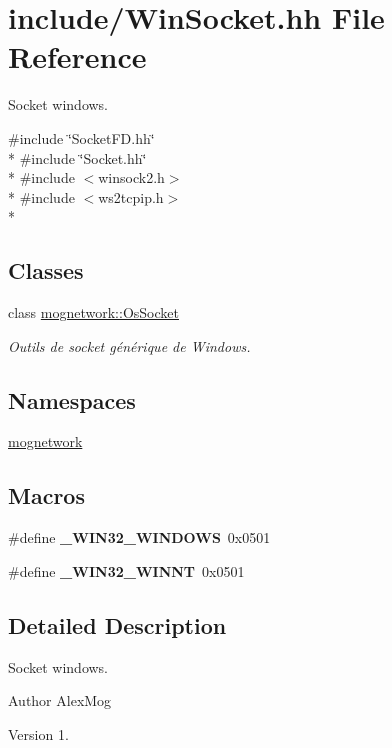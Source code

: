 \hypertarget{_win_socket_8hh}{\section{include/\-Win\-Socket.hh File Reference}
\label{_win_socket_8hh}
}


Socket windows.  


{\ttfamily \#include \char`\"{}Socket\-F\-D.\-hh\char`\"{}}\\*
{\ttfamily \#include \char`\"{}Socket.\-hh\char`\"{}}\\*
{\ttfamily \#include $<$winsock2.\-h$>$}\\*
{\ttfamily \#include $<$ws2tcpip.\-h$>$}\\*
\subsection*{Classes}
\begin{DoxyCompactItemize}
\item 
class \hyperlink{classmognetwork_1_1_os_socket}{mognetwork\-::\-Os\-Socket}
\begin{DoxyCompactList}\small\item\em Outils de socket générique de Windows. \end{DoxyCompactList}\end{DoxyCompactItemize}
\subsection*{Namespaces}
\begin{DoxyCompactItemize}
\item 
\hyperlink{namespacemognetwork}{mognetwork}
\end{DoxyCompactItemize}
\subsection*{Macros}
\begin{DoxyCompactItemize}
\item 
\hypertarget{_win_socket_8hh_a074ca98c073d899c62fc6629918186c8}{\#define {\bfseries \-\_\-\-W\-I\-N32\-\_\-\-W\-I\-N\-D\-O\-W\-S}~0x0501}\label{_win_socket_8hh_a074ca98c073d899c62fc6629918186c8}

\item 
\hypertarget{_win_socket_8hh_ac50762666aa00bd3a4308158510f1748}{\#define {\bfseries \-\_\-\-W\-I\-N32\-\_\-\-W\-I\-N\-N\-T}~0x0501}\label{_win_socket_8hh_ac50762666aa00bd3a4308158510f1748}

\end{DoxyCompactItemize}


\subsection{Detailed Description}
Socket windows. \begin{DoxyAuthor}{Author}
Alex\-Mog 
\end{DoxyAuthor}
\begin{DoxyVersion}{Version}
1. 
\end{DoxyVersion}

